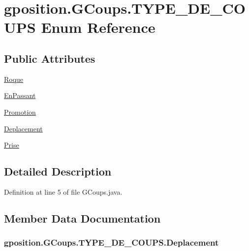 \hypertarget{enumgposition_1_1_g_coups_1_1_t_y_p_e___d_e___c_o_u_p_s}{\section{gposition.\-G\-Coups.\-T\-Y\-P\-E\-\_\-\-D\-E\-\_\-\-C\-O\-U\-P\-S Enum Reference}
\label{enumgposition_1_1_g_coups_1_1_t_y_p_e___d_e___c_o_u_p_s}
}
\subsection*{Public Attributes}
\begin{DoxyCompactItemize}
\item 
\hyperlink{enumgposition_1_1_g_coups_1_1_t_y_p_e___d_e___c_o_u_p_s_a41fe1ec334b1b0dad438c2d81e43a9f7}{Roque}
\item 
\hyperlink{enumgposition_1_1_g_coups_1_1_t_y_p_e___d_e___c_o_u_p_s_a6c6e43824e6586c24c288be4db8d21a0}{En\-Passant}
\item 
\hyperlink{enumgposition_1_1_g_coups_1_1_t_y_p_e___d_e___c_o_u_p_s_aec4dbebcabf123c208fc79cb8643499e}{Promotion}
\item 
\hyperlink{enumgposition_1_1_g_coups_1_1_t_y_p_e___d_e___c_o_u_p_s_af1b43118f1540aba3c7479312ed16e5a}{Deplacement}
\item 
\hyperlink{enumgposition_1_1_g_coups_1_1_t_y_p_e___d_e___c_o_u_p_s_a08cfa28aa960a8c60ddc8ab7cc4d0902}{Prise}
\end{DoxyCompactItemize}


\subsection{Detailed Description}


Definition at line 5 of file G\-Coups.\-java.



\subsection{Member Data Documentation}
\hypertarget{enumgposition_1_1_g_coups_1_1_t_y_p_e___d_e___c_o_u_p_s_af1b43118f1540aba3c7479312ed16e5a}{
\subsubsection[{Deplacement}]{\setlength{\rightskip}{0pt plus 5cm}gposition.\-G\-Coups.\-T\-Y\-P\-E\-\_\-\-D\-E\-\_\-\-C\-O\-U\-P\-S.\-Deplacement}}\label{enumgposition_1_1_g_coups_1_1_t_y_p_e___d_e___c_o_u_p_s_af1b43118f1540aba3c7479312ed16e5a}


